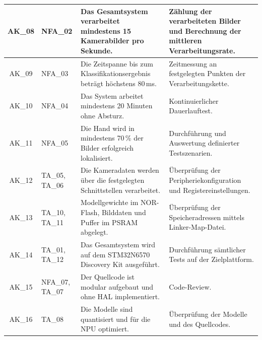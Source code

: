 \begin{longtable}{|c|p{2.75cm}|p{}|p{}|}
    \hline
    AK\_08 & NFA\_02 & Das Gesamtsystem verarbeitet mindestens 15 Kamerabilder pro Sekunde. & Zählung der verarbeiteten Bilder und Berechnung der mittleren Verarbeitungsrate. \\
    \hline
    AK\_09 & NFA\_03 & Die Zeitspanne bis zum Klassifikationsergebnis beträgt höchstens 80\,ms. & Zeitmessung an festgelegten Punkten der Verarbeitungskette. \\
    \hline
    AK\_10 & NFA\_04 & Das System arbeitet mindestens 20 Minuten ohne Absturz. & Kontinuierlicher Dauerlauftest. \\
    \hline
    AK\_11 & NFA\_05 & Die Hand wird in mindestens 70\,\% der Bilder erfolgreich lokalisiert. & Durchführung und Auswertung definierter Testszenarien. \\
    \hline
    AK\_12 & TA\_05, TA\_06 & Die Kameradaten werden über die festgelegten Schnittstellen verarbeitet. & Überprüfung der Peripheriekonfiguration und Registereinstellungen. \\
    \hline
    AK\_13 & TA\_10, TA\_11 & Modellgewichte im NOR-Flash, Bilddaten und Puffer im PSRAM abgelegt. & Überprüfung der Speicheradressen mittels Linker-Map-Datei. \\
    \hline
    AK\_14 & TA\_01, TA\_12 & Das Gesamtsystem wird auf dem STM32N6570 Discovery Kit ausgeführt. & Durchführung sämtlicher Tests auf der Zielplattform. \\
    \hline
    AK\_15 & NFA\_07, TA\_07 & Der Quellcode ist modular aufgebaut und ohne HAL implementiert. & Code-Review. \\
    \hline
    AK\_16 & TA\_08 & Die Modelle sind quantisiert und für die NPU optimiert. & Überprüfung der Modelle und des Quellcodes. \\
    \hline
\end{longtable}

